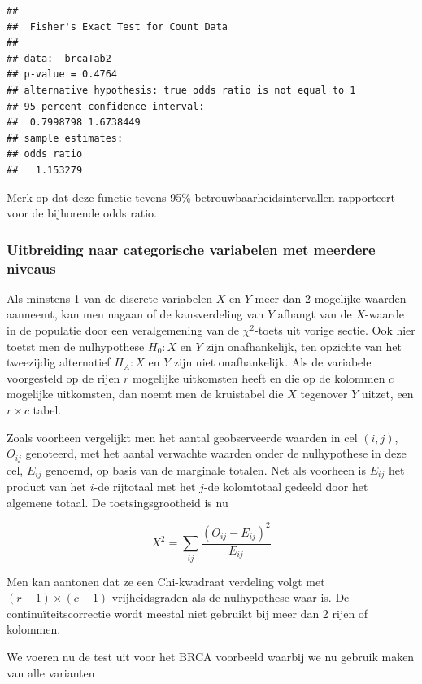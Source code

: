 \documentclass[
  12pt,dutch]{book}
\theoremstyle{definition}
\theoremstyle{definition}
\theoremstyle{definition}
\theoremstyle{definition}
\theoremstyle{remark}
\begin{document}
\begin{verbatim}
## 
##  Fisher's Exact Test for Count Data
## 
## data:  brcaTab2
## p-value = 0.4764
## alternative hypothesis: true odds ratio is not equal to 1
## 95 percent confidence interval:
##  0.7998798 1.6738449
## sample estimates:
## odds ratio 
##   1.153279
\end{verbatim}

Merk op dat deze functie tevens 95\% betrouwbaarheidsintervallen rapporteert voor de bijhorende odds ratio.

\subsubsection{Uitbreiding naar categorische variabelen met meerdere niveaus}\label{uitbreiding-naar-categorische-variabelen-met-meerdere-niveaus}

Als minstens 1 van de discrete variabelen \(X\) en \(Y\) meer dan 2 mogelijke
waarden aanneemt, kan men nagaan of de kansverdeling van \(Y\) afhangt van de \(X\)-waarde in de populatie door een veralgemening van de \(\chi^2\)-toets
uit vorige sectie. Ook hier toetst men de nulhypothese \(H_0: X\) en \(Y\) zijn
onafhankelijk, ten opzichte van het tweezijdig alternatief \(H_A: X\) en \(Y\)
zijn niet onafhankelijk. Als de variabele voorgesteld op de rijen \(r\)
mogelijke uitkomsten heeft en die op de kolommen \(c\) mogelijke uitkomsten,
dan noemt men de kruistabel die \(X\) tegenover \(Y\) uitzet, een \(r \times c\)
tabel.

Zoals voorheen vergelijkt men het aantal geobserveerde waarden in cel \((i,j)\), \(O_{ij}\) genoteerd, met het aantal verwachte waarden onder de nulhypothese
in deze cel, \(E_{ij}\) genoemd, op basis van de marginale totalen. Net als
voorheen is \(E_{ij}\) het product van het \(i\)-de rijtotaal met het \(j\)-de
kolomtotaal gedeeld door het algemene totaal. De toetsingsgrootheid is nu

\begin{equation*}
X^2 = \sum_{ij} \frac{\left (O_{ij} - E_{ij}\right)^2 }{ E_{ij}}
\end{equation*}

Men kan aantonen dat ze een Chi-kwadraat verdeling volgt met \((r-1) \times
(c-1)\) vrijheidsgraden als de nulhypothese waar is. De continuïteitscorrectie wordt meestal niet gebruikt bij meer dan 2 rijen of
kolommen.

We voeren nu de test uit voor het BRCA voorbeeld waarbij we nu gebruik maken van alle varianten
\end{document}
